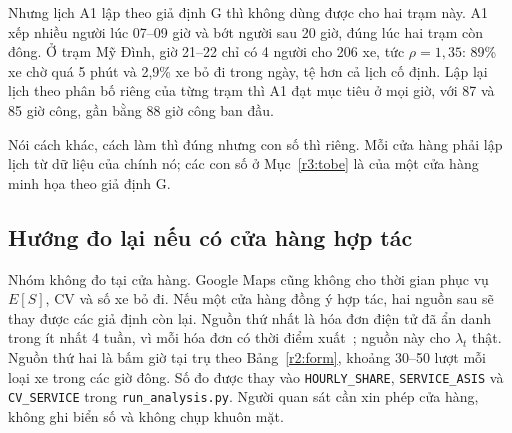\begin{table}[htbp]\centering\small
\caption{A0 và A1 khi lượt xe theo giả định G so với theo Google Maps}\label{r2:gmaps-table}
\resizebox{\linewidth}{!}{}
\end{table}

Nhưng lịch A1 lập theo giả định G thì không dùng được cho hai trạm này. A1 xếp nhiều người lúc 07--09 giờ và bớt người sau 20 giờ, đúng lúc hai trạm còn đông. Ở trạm Mỹ Đình, giờ 21--22 chỉ có 4 người cho 206 xe, tức $\rho=1{,}35$: 89\% xe chờ quá 5 phút và 2,9\% xe bỏ đi trong ngày, tệ hơn cả lịch cố định. Lập lại lịch theo phân bố riêng của từng trạm thì A1 đạt mục tiêu ở mọi giờ, với 87 và 85 giờ công, gần bằng 88 giờ công ban đầu.

Nói cách khác, cách làm thì đúng nhưng con số thì riêng. Mỗi cửa hàng phải lập lịch từ dữ liệu của chính nó; các con số ở Mục~\ref{r3:tobe} là của một cửa hàng minh họa theo giả định G.

\subsection{Hướng đo lại nếu có cửa hàng hợp tác}
\noindent
Nhóm không đo tại cửa hàng. Google Maps cũng không
cho thời gian phục vụ $E[S]$, CV và số xe bỏ đi. Nếu một cửa hàng đồng ý hợp
tác, hai nguồn sau sẽ thay được các giả định còn lại. Nguồn thứ nhất là hóa đơn
điện tử đã ẩn danh trong ít nhất 4 tuần, vì mỗi hóa đơn có thời điểm
xuất~\cite{nd70}; nguồn này cho $\lambda_t$ thật. Nguồn thứ hai là bấm giờ tại
trụ theo Bảng~\ref{r2:form}, khoảng 30--50 lượt mỗi loại xe trong các giờ đông.
Số đo được thay vào \texttt{HOURLY\_SHARE}, \texttt{SERVICE\_ASIS} và
\texttt{CV\_SERVICE} trong \texttt{run\_analysis.py}. Người quan sát cần xin phép
cửa hàng, không ghi biển số và không chụp khuôn mặt.

